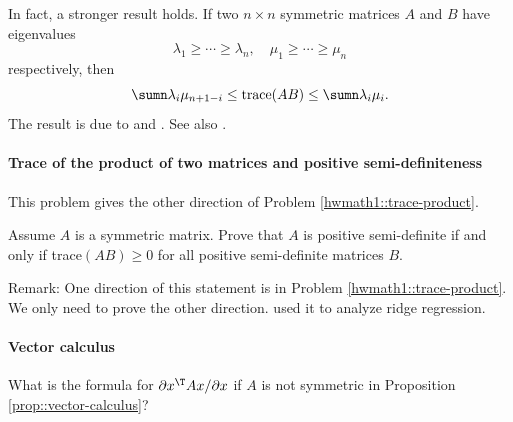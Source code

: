 In fact, a stronger result holds. If two $n\times n$ symmetric matrices $A$ and $B$ have eigenvalues
$$
\lambda_1 \geq \cdots \geq \lambda_n, \quad
\mu_1 \geq \cdots \geq \mu_n
$$
respectively, then 
$$
\sumn \lambda_i \mu_{n+1-i} \leq 
\textup{trace}(AB) \leq 
\sumn \lambda_i \mu_i. 
$$
The result is
due to \citet{von1937some} and \citet{ruhe1970perturbation}. See also \citet[][Lemma 4.12]{chen2019model}.

 

\paragraph{Trace of the product of two matrices and positive semi-definiteness}
\label{hwmath1::trace-product-psd}


This problem gives the other direction of Problem \ref{hwmath1::trace-product}.


Assume $A$ is a symmetric matrix. Prove that $A$ is positive semi-definite if and only if trace$(AB) \geq 0$ for all positive semi-definite matrices $B$. 


Remark: One direction of this statement is in Problem \ref{hwmath1::trace-product}. We only need to prove the other direction. \citet{theobald1974generalizations} used it to analyze ridge regression. 




\paragraph{Vector calculus}\label{hwmath1::vector-calculus-asymmetric}
What is the formula for $ \partial  x^{\T} A x / \partial  x$ if $A$ is not symmetric in Proposition 
\ref{prop::vector-calculus}?  

 

